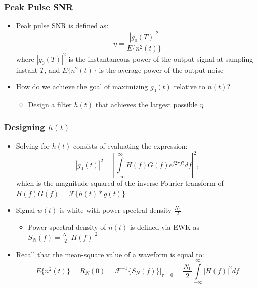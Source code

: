 \documentclass[10pt]{beamer}
\begin{document}
\frame
{
  \frametitle{Peak Pulse SNR}

  \begin{itemize}
    \item Peak pulse SNR is defined as:
    \begin{equation}
        \eta=\frac{|g_0(T)|^2}{E\{n^2(t)\}}
    \end{equation}
    where $|g_0(T)|^2$ is the instantaneous power of the output signal at sampling instant $T$, and $E\{n^2(t)\}$ is the average power of the output noise
    \item How do we achieve the goal of maximizing $g_0(t)$ relative to $n(t)$?
    \begin{itemize}
        \item Design a filter $h(t)$ that achieves the largest possible $\eta$
    \end{itemize}
  \end{itemize}

}

\frame
{
  \frametitle{Designing $h(t)$}

  \begin{itemize}
    \item Solving for $h(t)$ consists of evaluating the expression:
    \begin{equation}
        |g_0(t)|^2=\left|\int\limits_{-\infty}^{\infty}H(f)G(f)e^{j2\pi{f}{t}}df\right|^2,
    \end{equation}
    which is the magnitude squared of the inverse Fourier transform of $H(f)G(f)=\mathcal{F}\{h(t)\ast{g(t)}\}$
    \item Signal $w(t)$ is white with power spectral density $\frac{N_0}{2}$
    \begin{itemize}
        \item Power spectral density of $n(t)$ is defined via EWK as $S_N(f)=\frac{N_0}{2}|H(f)|^2$
    \end{itemize}
    \item Recall that the mean-square value of a waveform is equal to:
    \begin{equation}
        E\{n^2(t)\}=R_N(0)=\mathcal{F}^{-1}\left.\{S_N(f)\}\right|_{\tau=0}=\frac{N_0}{2}\int\limits_{-\infty}^{\infty}|H(f)|^2df\nonumber
    \end{equation}
  \end{itemize}

}
\end{document}
